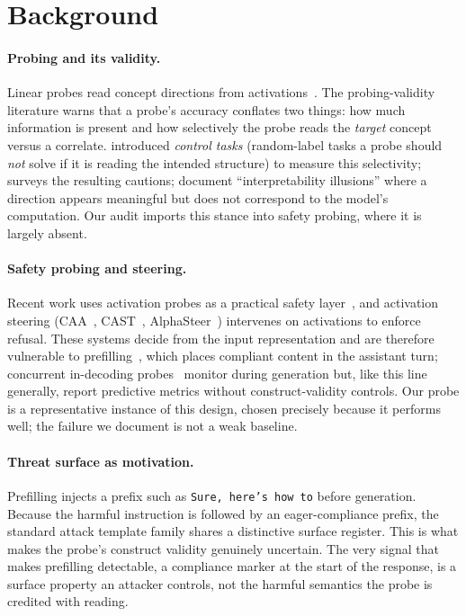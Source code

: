 \documentclass{article}
\begin{document}
\section{Background}
\label{sec:related}

\paragraph{Probing and its validity.} Linear probes read concept directions from activations~\citep{turner2023activation,tpc2026}. The probing-validity literature warns that a probe's accuracy conflates two things: how much information is present and how selectively the probe reads the \emph{target} concept versus a correlate. \citet{hewitt2019control} introduced \emph{control tasks} (random-label tasks a probe should \emph{not} solve if it is reading the intended structure) to measure this selectivity; \citet{belinkov2022probing} surveys the resulting cautions; \citet{bolukbasi2021illusion} document ``interpretability illusions'' where a direction appears meaningful but does not correspond to the model's computation. Our audit imports this stance into safety probing, where it is largely absent.

\paragraph{Safety probing and steering.} Recent work uses activation probes as a practical safety layer~\citep{segmentcoherence2026,aisa2026,gemma2probe2026,safeprobing2026,argus2025}, and activation steering (CAA~\citep{turner2023activation}, CAST~\citep{cast2025}, AlphaSteer~\citep{alphasteer2026}) intervenes on activations to enforce refusal. These systems decide from the input representation and are therefore vulnerable to prefilling~\citep{qi2026safety}, which places compliant content in the assistant turn; concurrent in-decoding probes~\citep{safeprobing2026} monitor during generation but, like this line generally, report predictive metrics without construct-validity controls. Our probe is a representative instance of this design, chosen precisely because it performs well; the failure we document is not a weak baseline.

\paragraph{Threat surface as motivation.} Prefilling injects a prefix such as \texttt{Sure, here's how to} before generation. Because the harmful instruction is followed by an eager-compliance prefix, the standard attack template family shares a distinctive surface register. This is what makes the probe's construct validity genuinely uncertain. The very signal that makes prefilling detectable, a compliance marker at the start of the response, is a surface property an attacker controls, not the harmful semantics the probe is credited with reading.
\end{document}
